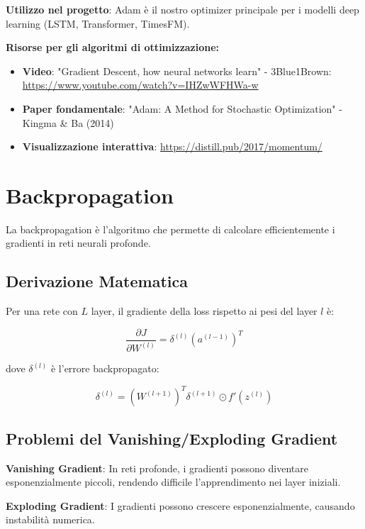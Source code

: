 \documentclass[12pt,a4paper,twoside]{report}
\begin{document}
\textbf{Utilizzo nel progetto}: Adam è il nostro optimizer principale per i modelli deep learning (LSTM, Transformer, TimesFM).

\textbf{Risorse per gli algoritmi di ottimizzazione:}
\begin{itemize}
    \item \textbf{Video}: "Gradient Descent, how neural networks learn" - 3Blue1Brown: \url{https://www.youtube.com/watch?v=IHZwWFHWa-w}
    \item \textbf{Paper fondamentale}: "Adam: A Method for Stochastic Optimization" - Kingma \& Ba (2014)
    \item \textbf{Visualizzazione interattiva}: \url{https://distill.pub/2017/momentum/}
\end{itemize}

\section{Backpropagation}

La backpropagation è l'algoritmo che permette di calcolare efficientemente i gradienti in reti neurali profonde.

\subsection{Derivazione Matematica}

Per una rete con $L$ layer, il gradiente della loss rispetto ai pesi del layer $l$ è:

\begin{equation}
\frac{\partial J}{\partial W^{(l)}} = \delta^{(l)} (a^{(l-1)})^T
\end{equation}

dove $\delta^{(l)}$ è l'errore backpropagato:

\begin{equation}
\delta^{(l)} = (W^{(l+1)})^T \delta^{(l+1)} \odot f'(z^{(l)})
\end{equation}

\subsection{Problemi del Vanishing/Exploding Gradient}

\textbf{Vanishing Gradient}: In reti profonde, i gradienti possono diventare esponenzialmente piccoli, rendendo difficile l'apprendimento nei layer iniziali.

\textbf{Exploding Gradient}: I gradienti possono crescere esponenzialmente, causando instabilità numerica.
\end{document}
